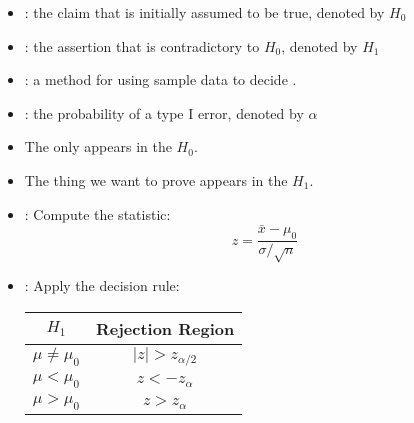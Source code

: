 \begin{multicols*}{3}
  

  \begin{itemize}
    \item {}:  the claim that is initially assumed to be true, denoted by $H_0$
    \item {}: the assertion that is contradictory to $H_0$, denoted by $H_1$
    \item {}: a method for using sample data to decide .
    \item {}: the probability of a type I error, denoted by $\alpha$
  \end{itemize}

  \begin{itemize}
    \item The  only appears in the  $H_0$.
    \item The thing we want to prove appears in the  $H_1$. 
  \end{itemize}

  \begin{itemize}
    \item {}: Compute the statistic:
      \[
        z = \frac{\bar{x} - \mu_0}{\sigma / \sqrt{n}}
      \]
    \item {}: Apply the decision rule:
      \begin{center}
        \begin{tabular}{|c|c|}
          \hline
          \textbf{$H_1$}   & \textbf{Rejection Region} \\ \hline
          $\mu \neq \mu_0$ & $|z| > z_{\alpha/2}$      \\ \hline
          $\mu < \mu_0$    & $z < -z_{\alpha}$         \\ \hline
          $\mu > \mu_0$    & $z > z_{\alpha}$          \\ \hline
        \end{tabular}
      \end{center}
  \end{itemize}


\end{multicols*}
